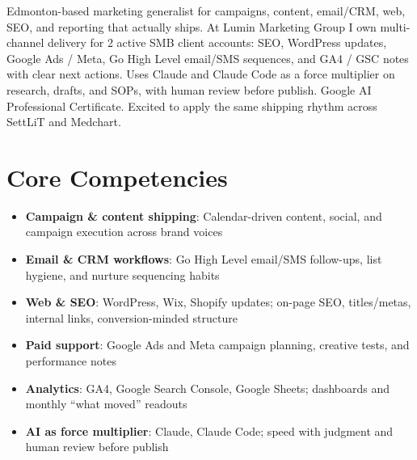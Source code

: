 \documentclass[11pt,a4paper,sans]{moderncv}
\begin{document}
\makecvtitle

\vspace{6pt}
\small{Edmonton-based marketing generalist for campaigns, content, email/CRM, web, SEO, and reporting that actually ships. At Lumin Marketing Group I own multi-channel delivery for 2 active SMB client accounts: SEO, WordPress updates, Google Ads / Meta, Go High Level email/SMS sequences, and GA4 / GSC notes with clear next actions. Uses Claude and Claude Code as a force multiplier on research, drafts, and SOPs, with human review before publish. Google AI Professional Certificate. Excited to apply the same shipping rhythm across SettLiT and Medchart.}

\section{Core Competencies}
\vspace{1pt}
\begin{itemize}
\item \textbf{Campaign \& content shipping}: Calendar-driven content, social, and campaign execution across brand voices
\item \textbf{Email \& CRM workflows}: Go High Level email/SMS follow-ups, list hygiene, and nurture sequencing habits
\item \textbf{Web \& SEO}: WordPress, Wix, Shopify updates; on-page SEO, titles/metas, internal links, conversion-minded structure
\item \textbf{Paid support}: Google Ads and Meta campaign planning, creative tests, and performance notes
\item \textbf{Analytics}: GA4, Google Search Console, Google Sheets; dashboards and monthly ``what moved'' readouts
\item \textbf{AI as force multiplier}: Claude, Claude Code; speed with judgment and human review before publish
\end{itemize}
\end{document}
